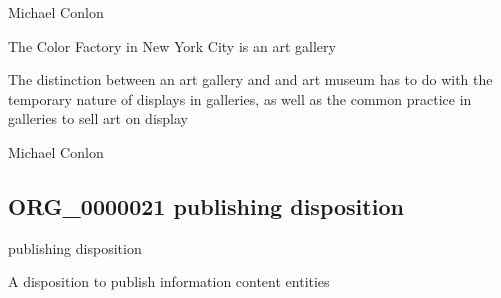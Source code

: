 \documentclass[letterpaper,10pt,english]{sphinxmanual}
\begin{document}
\begin{sphinxShadowBox}

\sphinxAtStartPar
Michael Conlon 
\end{sphinxShadowBox}

\begin{sphinxShadowBox}

\sphinxAtStartPar
The Color Factory in New York City is an art gallery
\end{sphinxShadowBox}

\begin{sphinxShadowBox}

\sphinxAtStartPar
The distinction between an art gallery and and art museum has to do with the temporary nature of displays in galleries, as well as the common practice in galleries to sell art on display
\end{sphinxShadowBox}

\begin{sphinxShadowBox}

\sphinxAtStartPar
Michael Conlon 
\end{sphinxShadowBox}
\begin{quote}

\ignorespaces \end{quote}


\subsection{ORG\_0000021 \sphinxhyphen{} publishing disposition}
\label{\detokenize{doc-ORG_0000021:org-0000021-publishing-disposition}}\label{\detokenize{doc-ORG_0000021:index-0}}\label{\detokenize{doc-ORG_0000021::doc}}
\begin{sphinxShadowBox}

\sphinxAtStartPar
publishing disposition
\end{sphinxShadowBox}

\begin{sphinxShadowBox}

\sphinxAtStartPar
A disposition to publish information content entities
\end{sphinxShadowBox}
\end{document}

